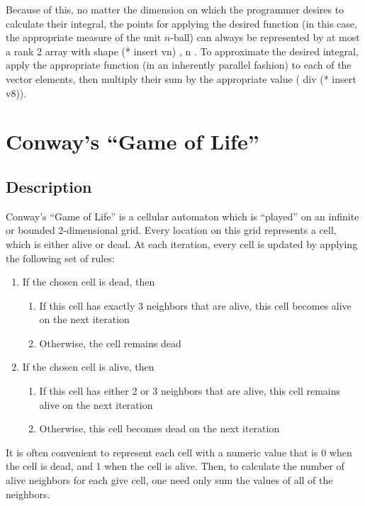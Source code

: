 Because of this, no matter the dimension on which the programmer desires to calculate their integral, 
the points for applying the desired function (in this case, the appropriate measure of the unit $n$-ball) 
can always be represented by at most a rank 2 array with shape \ttfamily (* insert vn) , n \normalfont.
To approximate the desired integral, apply the appropriate function (in an inherently parallel fashion) 
to each of the vector elements, then multiply their sum by the appropriate value ( div (* insert v8)\normalfont).

\section{Conway's ``Game of Life''}
\subsection{Description}
Conway's ``Game of Life''\cite{gol} is a cellular automaton which is ``played'' on an infinite or bounded 2-dimensional grid. 
Every location on this grid represents a cell, which is either alive or dead. 
At each iteration, every cell is updated by applying the following set of rules:

\begin{enumerate}
	\item If the chosen cell is dead, then
	\begin{enumerate}
		\item If this cell has exactly 3 neighbors that are alive, 
			this cell becomes alive on the next iteration
		\item Otherwise, the cell remains dead
	\end{enumerate}
	\item If the chosen cell is alive, then
	\begin{enumerate}
		\item If this cell has either 2 or 3 neighbors that are alive, 
			this cell remains alive on the next iteration
		\item Otherwise, this cell becomes dead on the next iteration
	\end{enumerate}
\end{enumerate}

It is often convenient to represent each cell with a numeric value 
that is 0 when the cell is dead, and 1 when the cell is alive. 
Then, to calculate the number of alive neighbors for each give cell, 
one need only sum the values of all of the neighbors.

